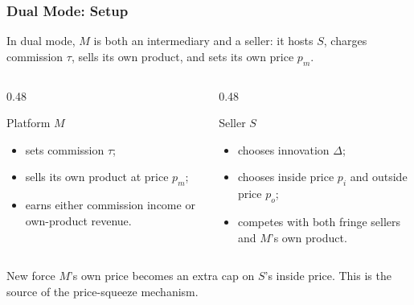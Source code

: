 \begin{frame}
  \frametitle{Dual Mode: Setup}
  \footnotesize
  In dual mode, $M$ is both an intermediary and a seller: it hosts $S$, charges
  commission $\tau$, sells its own product, and sets its own price $p_m$.

  \begin{columns}[T,onlytextwidth]
    \begin{column}{0.48\textwidth}
      \begin{block}{Platform $M$}
        \begin{itemize}
          \item sets commission $\tau$;
          \item sells its own product at price $p_m$;
          \item earns either commission income or own-product revenue.
        \end{itemize}
      \end{block}
    \end{column}

    \begin{column}{0.48\textwidth}
      \begin{block}{Seller $S$}
        \begin{itemize}
          \item chooses innovation $\Delta$;
          \item chooses inside price $p_i$ and outside price $p_o$;
          \item competes with both fringe sellers and $M$'s own product.
        \end{itemize}
      \end{block}
    \end{column}
  \end{columns}

  \begin{alertblock}{New force}
    $M$'s own price becomes an extra cap on $S$'s inside price. This is the
    source of the price-squeeze mechanism.
  \end{alertblock}
\end{frame}

